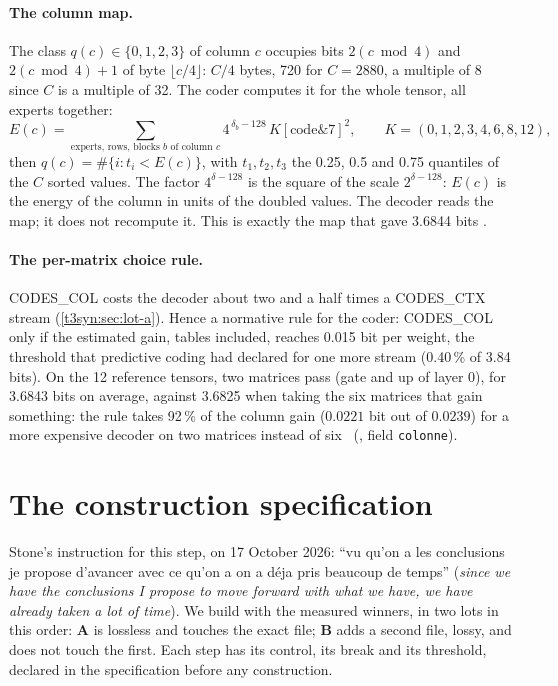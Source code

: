 \paragraph{The column map.} The class $q(c) \in \{0, 1, 2, 3\}$ of column $c$ occupies bits $2(c \bmod 4)$ and $2(c \bmod 4) + 1$ of byte $\lfloor c/4 \rfloor$: $C/4$ bytes, 720 for $C = 2880$, a multiple of 8 since $C$ is a multiple of 32. The coder computes it for the whole tensor, all experts together:
\[
E(c) = \sum_{\text{experts, rows, blocks } b \text{ of column } c} 4^{\,\delta_b - 128}\, K[\mathrm{code} \mathbin{\&} 7]^2, \qquad K = (0, 1, 2, 3, 4, 6, 8, 12),
\]
then $q(c) = \#\{i : t_i < E(c)\}$, with $t_1, t_2, t_3$ the 0.25, 0.5 and 0.75 quantiles of the $C$ sorted values. The factor $4^{\delta - 128}$ is the square of the scale $2^{\delta - 128}$: $E(c)$ is the energy of the column in units of the doubled values. The decoder reads the map; it does not recompute it. This is exactly the map that gave \num{3.6844} bits \mes.

\paragraph{The per-matrix choice rule.} CODES\_COL costs the decoder about two and a half times a CODES\_CTX stream (\cref{t3syn:sec:lot-a}). Hence a normative rule for the coder: CODES\_COL only if the estimated gain, tables included, reaches 0.015 bit per weight, the threshold that predictive coding had declared for one more stream (0.40\,\% of 3.84 bits). On the 12 reference tensors, two matrices pass (gate and up of layer 0), for \num{3.6843} bits on average, against \num{3.6825} when taking the six matrices that gain something: the rule takes 92\,\% of the column gain ($0.0221$ bit out of $0.0239$) for a more expensive decoder on two matrices instead of six \calc~(, field \texttt{colonne}).

\section{The construction specification}\label{t3syn:sec:cahier}

Stone's instruction for this step, on 17 October 2026: ``vu qu'on a les conclusions je propose d'avancer avec ce qu'on a on a déja pris beaucoup de temps'' (\emph{since we have the conclusions I propose to move forward with what we have, we have already taken a lot of time}). We build with the measured winners, in two lots in this order: \textbf{A} is lossless and touches the exact file; \textbf{B} adds a second file, lossy, and does not touch the first. Each step has its control, its break and its threshold, declared in the specification before any construction.

